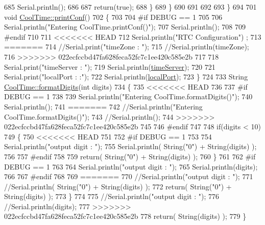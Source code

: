 \begin{DoxyCode}
685             Serial.println();
686         
687             \textcolor{keywordflow}{return}(\textcolor{keyword}{true}); 
688         \}
689     \}   
690 
691 
692 
693 \}
694 
701 \textcolor{keywordtype}{void} \hyperlink{classCoolTime_af355e7f9b3898211cd2ff25eab5933b1}{CoolTime::printConf}()
702 \{
703 
704 \textcolor{preprocessor}{#if DEBUG == 1}
705 
706     Serial.println(\textcolor{stringliteral}{"Entering CoolTime.printConf()"});
707     Serial.println();
708 
709 \textcolor{preprocessor}{#endif }
710 
711 <<<<<<< HEAD
712     Serial.println(\textcolor{stringliteral}{"RTC Configuration"}) ;
713 =======
714     \textcolor{comment}{//Serial.print("timeZone : ");}
715     \textcolor{comment}{//Serial.println(timeZone);}
716 >>>>>>> 022ecfccbd47fa628feca52fc7c1ee420c585e2b
717 
718     Serial.print(\textcolor{stringliteral}{"timeServer : "});
719     Serial.println(\hyperlink{classCoolTime_ad2b9858f399108cb440dd1e908916f04}{timeServer});
720     
721     Serial.print(\textcolor{stringliteral}{"localPort : :"});
722     Serial.println(\hyperlink{classCoolTime_a2f777da44d7ba678be8185299e9b49d1}{localPort});
723 \}
724 
733 String \hyperlink{classCoolTime_acd537cd4210d7bde4e1f5c47d2ac0456}{CoolTime::formatDigits}(\textcolor{keywordtype}{int} digits)
734 \{
735 <<<<<<< HEAD
736 
737 \textcolor{preprocessor}{#if DEBUG == 1 }
738 
739     Serial.println(\textcolor{stringliteral}{"Entering CoolTime.formatDigits()"});
740     Serial.println();
741 =======
742     \textcolor{comment}{//Serial.println("Entering CoolTime.formatDigits()");}
743     \textcolor{comment}{//Serial.println();}
744 >>>>>>> 022ecfccbd47fa628feca52fc7c1ee420c585e2b
745 
746 \textcolor{preprocessor}{#endif }
747 
748     \textcolor{keywordflow}{if}(digits < 10)
749     \{
750 <<<<<<< HEAD
751     
752 \textcolor{preprocessor}{    #if DEBUG == 1}
753 
754         Serial.println(\textcolor{stringliteral}{"output digit : "});
755         Serial.println( String(\textcolor{stringliteral}{"0"}) + String(digits) );
756 
757 \textcolor{preprocessor}{    #endif}
758 
759         \textcolor{keywordflow}{return}( String(\textcolor{stringliteral}{"0"}) + String(digits) );
760     \}
761     
762 \textcolor{preprocessor}{#if DEBUG == 1 }
763 
764     Serial.println(\textcolor{stringliteral}{"output digit : "});
765     Serial.println(digits);
766 
767 \textcolor{preprocessor}{#endif}
768 
769 =======
770         \textcolor{comment}{//Serial.println("output digit : ");}
771         \textcolor{comment}{//Serial.println( String("0") + String(digits) );}
772         \textcolor{keywordflow}{return}( String(\textcolor{stringliteral}{"0"}) + String(digits) );
773     \}
774     
775     \textcolor{comment}{//Serial.println("output digit : ");}
776     \textcolor{comment}{//Serial.println(digits);}
777 >>>>>>> 022ecfccbd47fa628feca52fc7c1ee420c585e2b
778     \textcolor{keywordflow}{return}( String(digits) );
779 \}
\end{DoxyCode}
